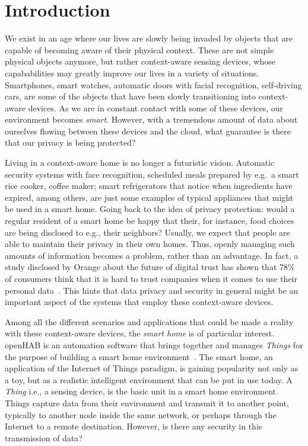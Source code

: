 \documentclass[12pt]{article}
\newcommand{\TODO}{\todo[inline]}
\begin{document}


\newpage
\tableofcontents


\newpage
{}%


\newpage
\section{Introduction}
\TODO{LIST OF FIGURES AND TABLES}
We exist in an age where our lives are slowly being invaded by objects that are capable of becoming aware of their physical context. These are not simple physical objects anymore, but rather context-aware sensing devices, whose capababilities may greatly improve our lives in a variety of situations. Smartphones, smart watches, automatic doors with facial recognition, self-driving cars, are some of the objects that have been slowly transitioning into context-aware devices. As we are in constant contact with some of these devices, our environment becomes \emph{smart}. However, with a tremendous amount of data about ourselves flowing between these devices and the cloud, what guarantee is there that our privacy is being protected?

Living in a context-aware home is no longer a futuristic vision. Automatic security systems with face recognition, scheduled meals prepared by e.g.\ a smart rice cooker, coffee maker; smart refrigerators that notice when ingredients have expired, among others, are just some examples of typical appliances that might be used in a smart home. Going back to the idea of privacy protection: would a regular resident of a smart home be happy that their, for instance, food choices are being disclosed to e.g., their neighbors? Usually, we expect that people are able to maintain their privacy in their own homes. Thus, openly managing such amounts of information becomes a problem, rather than an advantage. In fact, a study disclosed by Orange about the future of digital trust has shown that 78\% of consumers think that it is hard to trust companies when it comes to use their personal data~\cite{orange}. This hints that data privacy and security in general might be an important aspect of the systems that employ these context-aware devices. 

Among all the different scenarios and applications that could be made a reality with these context-aware devices, the \emph{smart home} is of particular interest. openHAB is an automation software that brings together and manages \emph{Things} for the purpose of building a smart home environment~\cite{openhab_02}. The smart home, an application of the Internet of Things paradigm, is gaining popularity not only as a toy, but as a realistic intelligent environment that can be put in use today. A \emph{Thing} i.e., a sensing device, is the basic unit in a smart home environment. Things capture data from their environment and transmit it to another point, typically to another node inside the same network, or perhaps through the Internet to a remote destination. However, is there any security in this transmission of data?
\end{document}
